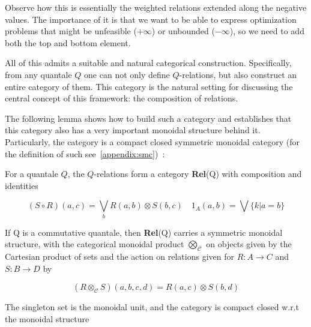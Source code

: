 Observe how this is essentially the weighted relations extended
along the negative values. The importance of it is that we want
to be able to express optimization problems that might be unfeasible
($+\infty$) or unbounded ($-\infty$), so we need to add both
the top and bottom element.

All of this admits a suitable and natural categorical construction.
Specifically, from any quantale $Q$ one can not only define $Q$-relations,
but also construct an entire category of them.
This category is the natural setting for discussing the
central concept of this framework: the composition of relations.

The following lemma shows how to build such a category and establishes
that this category also has a very important monoidal structure
behind it. Particularly, the category is a compact closed
symmetric monoidal category (for the definition of such see~\ref{appendix:smc})~\cite{maclane1998categories}:

\begin{proposition}
	For a quantale $Q$, the $Q$-relations form a category \textbf{Rel}(Q) with composition and identities

	\[
		(S\circ R) (a,c) = \bigvee_b R(a,b) \otimes S(b,c) \quad 1_A(a,b) = \bigvee \{k | a=b\}
	\]

	If Q is a commutative quantale, then \textbf{Rel}(Q) carries a symmetric monoidal structure, with the categorical monoidal product $\bigotimes_{\mathcal{C}}$ on objects given by the Cartesian product of sets and the action on relations given for $R:A \to C$ and $S:B\to D$ by

	\[
		(R\otimes_{\mathcal{C}} S)(a,b,c,d) = R(a,c) \otimes S(b,d)
	\]

	The singleton set is the monoidal unit, and the category is compact closed w.r.t the monoidal structure
\end{proposition}

